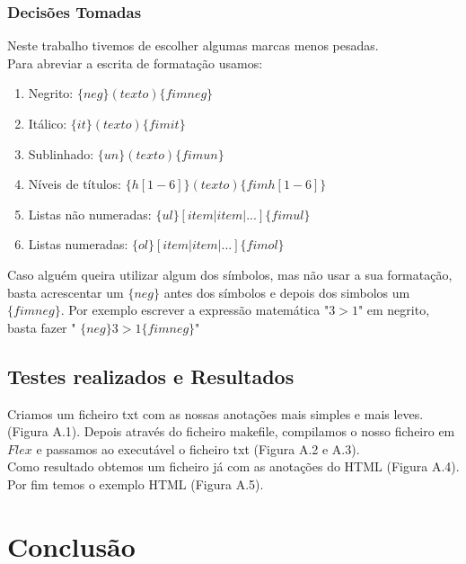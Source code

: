 \documentclass{report}
\begin{document}
\subsection{Decisões Tomadas}
Neste trabalho tivemos de escolher algumas marcas menos pesadas.\\ 
Para abreviar a escrita de formatação usamos: 

\begin{enumerate}[1-] 

\item Negrito: $\{$$neg$$\}(texto)\{$$fimneg$$\}$

\item Itálico: $\{$$it$$\}(texto)\{$$fimit$$\}$ 

\item Sublinhado: $\{$$un$$\}(texto)\{$$fimun$$\}$ 

\item Níveis de títulos: $\{$$h[1-6]$$\}(texto)\{$$fimh[1-6]$$\}$ 

\item Listas não numeradas: $\{$$ul$$\}[item | item|... ]\{$$fimul$$\}$ 

\item Listas numeradas: $\{$$ol$$\}[item | item|... ]\{$$fimol$$\}$


\end{enumerate}
Caso alguém queira utilizar algum dos símbolos, mas não usar a sua formatação, basta acrescentar um $\{neg\}$ 
antes dos símbolos e depois dos simbolos um $\{fimneg\}$. Por exemplo escrever a expressão matemática "$3>1$" em negrito, basta fazer  " $\{$$neg$$\}3>1\{$$fimneg$$\}$" 



\section{Testes realizados e Resultados}

Criamos um ficheiro txt com as nossas anotações mais simples e mais leves. (Figura A.1). Depois através do ficheiro makefile, compilamos o nosso ficheiro em $Flex$ e passamos ao executável o ficheiro txt (Figura A.2 e A.3).\\ 
Como resultado obtemos um ficheiro já com as anotações do HTML (Figura A.4).
Por fim temos o exemplo HTML (Figura A.5).



\chapter{Conclusão} \label{concl}
\end{document}
